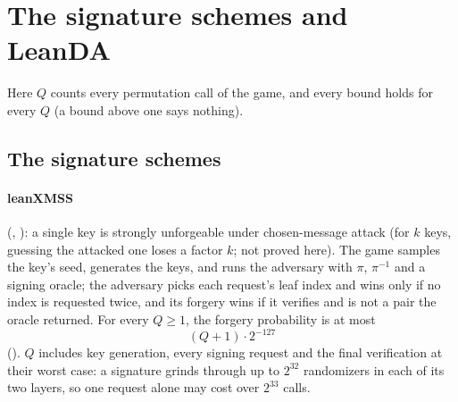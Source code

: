 \documentclass[11pt]{article}
\begin{document}
\section{The signature schemes and LeanDA}\label{sec:schemes}

Here $Q$ counts every permutation call of the game, and every bound holds for every $Q$ (a bound
above one says nothing).

\subsection*{The signature schemes}

\paragraph{leanXMSS} (,
): a single key is strongly unforgeable under chosen-message attack
(for $k$ keys, guessing the attacked one loses a factor $k$; not proved here).
The game samples the key's seed, generates the keys, and runs the adversary with $\pi$,
$\pi^{-1}$ and a signing oracle; the adversary picks each request's leaf index and wins
only if no index is requested twice, and its forgery wins if it verifies and is not a pair the
oracle returned. For every $Q \ge 1$, the forgery probability is at most
\[
\boxed{\ (Q + 1)\cdot 2^{-127}\ }
\]
(). $Q$ includes key generation, every signing request
and the final verification at their worst case: a signature grinds through up to $2^{32}$
randomizers in each of its two layers, so one request alone may cost over $2^{33}$ calls.
\end{document}
